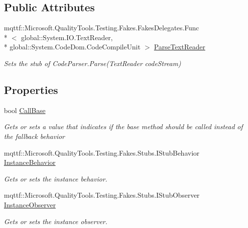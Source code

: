 \subsection*{Public Attributes}
\begin{DoxyCompactItemize}
\item 
mqttf\-::\-Microsoft.\-Quality\-Tools.\-Testing.\-Fakes.\-Fakes\-Delegates.\-Func\\*
$<$ global\-::\-System.\-I\-O.\-Text\-Reader, \\*
global\-::\-System.\-Code\-Dom.\-Code\-Compile\-Unit $>$ \hyperlink{class_system_1_1_code_dom_1_1_compiler_1_1_fakes_1_1_stub_code_parser_a9bff71275c6eaca67f9fd7c1ed570bb1}{Parse\-Text\-Reader}
\begin{DoxyCompactList}\small\item\em Sets the stub of Code\-Parser.\-Parse(\-Text\-Reader code\-Stream)\end{DoxyCompactList}\end{DoxyCompactItemize}
\subsection*{Properties}
\begin{DoxyCompactItemize}
\item 
bool \hyperlink{class_system_1_1_code_dom_1_1_compiler_1_1_fakes_1_1_stub_code_parser_a0472b35488d3b3d3a89cc650155e52b8}{Call\-Base}
\begin{DoxyCompactList}\small\item\em Gets or sets a value that indicates if the base method should be called instead of the fallback behavior\end{DoxyCompactList}\item 
mqttf\-::\-Microsoft.\-Quality\-Tools.\-Testing.\-Fakes.\-Stubs.\-I\-Stub\-Behavior \hyperlink{class_system_1_1_code_dom_1_1_compiler_1_1_fakes_1_1_stub_code_parser_aa9bfc3ab46538176df839096cf4edfbd}{Instance\-Behavior}
\begin{DoxyCompactList}\small\item\em Gets or sets the instance behavior.\end{DoxyCompactList}\item 
mqttf\-::\-Microsoft.\-Quality\-Tools.\-Testing.\-Fakes.\-Stubs.\-I\-Stub\-Observer \hyperlink{class_system_1_1_code_dom_1_1_compiler_1_1_fakes_1_1_stub_code_parser_a179da3663be604b6c2e99140cb8d6b57}{Instance\-Observer}
\begin{DoxyCompactList}\small\item\em Gets or sets the instance observer.\end{DoxyCompactList}\end{DoxyCompactItemize}


